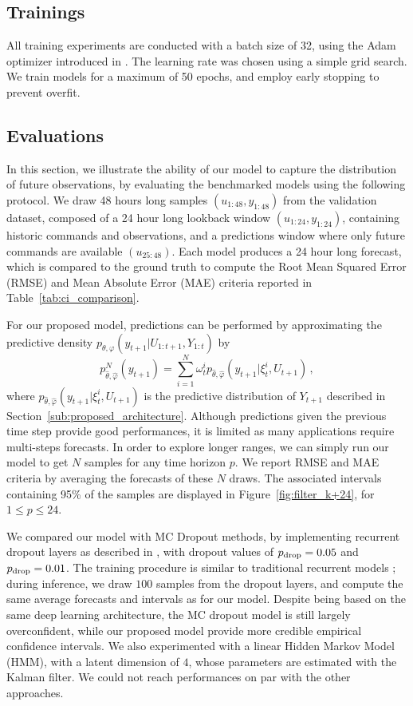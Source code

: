 \documentclass[journal]{IEEEtran}
\begin{document}
\subsection{Trainings}
\label{sub:trainings}
All training experiments are conducted with a batch size of 32, using the Adam optimizer introduced in \cite{Kingma2015AdamAM}.
The learning rate was chosen using a simple grid search.
We train models for a maximum of 50 epochs, and employ early stopping to prevent overfit.

\subsection{Evaluations}%
\label{sub:evaluations}

In this section, we illustrate the ability of our model to capture the distribution of future observations, by evaluating the benchmarked models using the following protocol. We draw 48 hours long samples $(u_{1:48}, y_{1:48})$ from the validation dataset, composed of a 24 hour long lookback window $(u_{1:24}, y_{1:24})$, containing historic commands and observations, and a predictions window where only future commands are available $(u_{25:48})$.
Each model produces a 24 hour long forecast, which is compared to the ground truth to compute the Root Mean Squared Error (RMSE) and Mean Absolute Error (MAE) criteria reported in Table~\ref{tab:ci_comparison}. %

For our proposed model, predictions can be performed by approximating the predictive density $p_{\theta,\varphi}(y_{t+1}|U_{1:t+1},Y_{1:t})$ by
$$
	p^N_{\widehat\theta,\widehat\varphi}(y_{t+1})= \sum_{i=1}^{N}\omega_t^i p_{\widehat\theta,\widehat\varphi}(y_{t+1}|\xi_t^i,U_{t+1})\,,
$$
where $ p_{\widehat\theta,\widehat\varphi}(y_{t+1}|\xi_t^i,U_{t+1})$ is the predictive distribution of $Y_{t+1}$ described in Section~\ref{sub:proposed_architecture}.
Although predictions given the previous time step provide good performances, it is limited as many applications require multi-steps forecasts.
In order to explore longer ranges, we can simply run our model to get $N$ samples for any time horizon $p$.
We report RMSE and MAE criteria by averaging the forecasts of these $N$ draws.
The associated intervals containing 95\% of the samples are displayed in Figure~\ref{fig:filter_k+24}, for $1\leq p \leq 24$.

We compared our model with MC Dropout methods, by implementing recurrent dropout layers as described in \cite{Gal2016NIPS}, with dropout values of $p_\textnormal{drop}=0.05$ and $p_\textnormal{drop}=0.01$.
The training procedure is similar to traditional recurrent models ; during inference, we draw $100$ samples from the dropout layers, and compute the same average forecasts and  intervals as for our model.
Despite being based on the same deep learning architecture, the MC dropout model is still largely overconfident, while our proposed model provide more credible empirical confidence intervals.
We also experimented with a linear Hidden Markov Model (HMM), with a latent dimension of $4$, whose parameters are estimated with the Kalman filter.
We could not reach performances on par with the other approaches.
\end{document}
